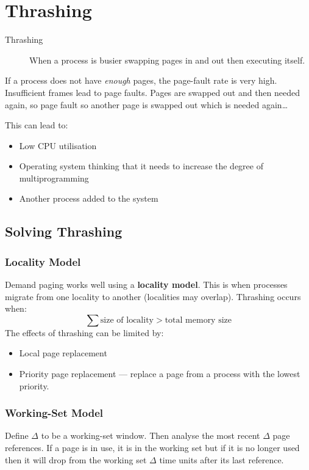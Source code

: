\documentclass[11pt]{article}
\begin{document}
\section{Thrashing}
\label{sec:orgdfe0501}
\begin{description}
\item[{Thrashing}] When a process is busier swapping pages in and out then executing itself.
\end{description}
If a process does not have \emph{enough} pages, the page-fault rate is very high.
Insufficient frames lead to page faults.
Pages are swapped out and then needed again, so page fault so another page is swapped out which is needed again\ldots{}

This can lead to:
\begin{itemize}
\item Low CPU utilisation
\item Operating system thinking that it needs to increase the degree of multiprogramming
\item Another process added to the system
\end{itemize}

\subsection{Solving Thrashing}
\label{sec:org094bfeb}
\subsubsection{Locality Model}
\label{sec:orgf97523e}
Demand paging works well using a \textbf{locality model}.
This is when processes migrate from one locality to another (localities may overlap).
Thrashing occurs when:
\begin{equation}
\sum \text{size of locality} > \text{total memory size}
\end{equation}
The effects of thrashing can be limited by:
\begin{itemize}
\item Local page replacement
\item Priority page replacement --- replace a page from a process with the lowest priority.
\end{itemize}

\subsubsection{Working-Set Model}
\label{sec:org1b87bdf}
Define \(\Delta\) to be a working-set window.
Then analyse the most recent \(\Delta\) page references.
If a page is in use, it is in the working set but if it is no longer used then it will drop from the working set \(\Delta\) time units after its last reference.
\end{document}
